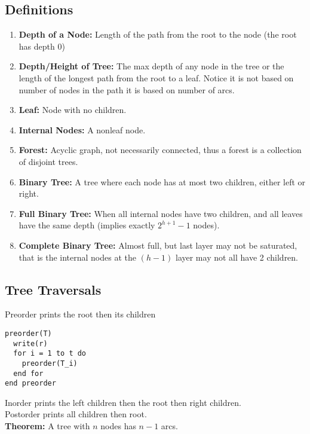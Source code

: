 \documentclass[14pt]{extreport}
\begin{document}
\subsection{Definitions}
\begin{enumerate}
  \item {\bf Depth of a Node:} Length of the path from the root to the node (the root has depth 0)
  \item {\bf Depth/Height of Tree:} The max depth of any node in the tree or the length of the longest path from the root to a leaf.
        Notice it is not based on number of nodes in the path it is based on number of arcs.
  \item {\bf Leaf:} Node with no children.
  \item {\bf Internal Nodes:} A nonleaf node.
  \item {\bf Forest:} Acyclic graph, not necessarily connected, thus a forest is a collection of disjoint trees.
  \item {\bf Binary Tree:} A tree where each node has at most two children, either left or right.
  \item {\bf Full Binary Tree:} When all internal nodes have two children, and all leaves have the same depth (implies exactly $2^{h+1}-1$ nodes).
  \item {\bf Complete Binary Tree:} Almost full, but last layer may not be saturated, that is the internal nodes at the $(h-1)$ layer may not all
    have 2 children.
\end{enumerate}

\subsection{Tree Traversals}
Preorder prints the root then its children
\begin{lstlisting}
preorder(T)
  write(r)
  for i = 1 to t do
    preorder(T_i)
  end for
end preorder
\end{lstlisting}
Inorder prints the left children then the root then right children.\\
Postorder prints all children then root.\\
{\bf Theorem:} A tree with $n$ nodes has $n-1$ arcs.\\
\end{document}
